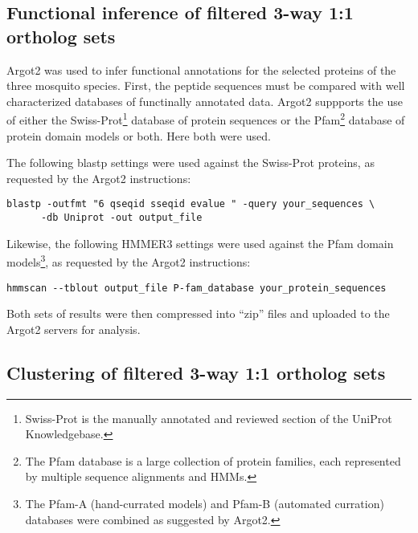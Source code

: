\subsection{Functional inference of filtered 3-way 1:1 ortholog sets}

\gls{Argot2} was used to infer functional annotations for the selected proteins of the three mosquito species.
First, the peptide sequences must be compared with well characterized databases of functinally annotated data.
\gls{Argot2} suppports the use of either the Swiss-Prot\footnote{Swiss-Prot is the manually annotated and reviewed section of the UniProt Knowledgebase.} database of protein sequences or the \gls{Pfam}\footnote{The Pfam database is a large collection of protein families, each represented by multiple sequence alignments and \glspl{HMM}.} database of protein domain models or both.
Here both were used.

The following blastp settings were used against the \gls{Swiss-Prot} proteins, as requested by the \gls{Argot2} instructions:

\begin{Verbatim}
blastp -outfmt "6 qseqid sseqid evalue " -query your_sequences \
      -db Uniprot -out output_file
\end{Verbatim}

Likewise, the following HMMER3 settings were used against the \gls{Pfam} domain models\footnote{The Pfam-A (hand-currated models) and Pfam-B (automated curration) databases were combined as suggested by \gls{Argot2}.}, as requested by the \gls{Argot2} instructions:


\begin{Verbatim}
hmmscan --tblout output_file P-fam_database your_protein_sequences
\end{Verbatim}

Both sets of results were then compressed into ``zip'' files and uploaded to the \gls{Argot2} servers for analysis.

\subsection{Clustering of filtered 3-way 1:1 ortholog sets} \label{chap:3-sec:clustering-of-filtered-ortholog-sets}

